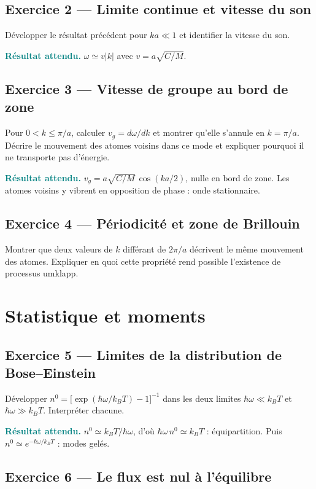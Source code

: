 \documentclass[11pt,a4paper]{article}
\newcommand{\rep}[1]{\par\smallskip\noindent\textcolor{teal}{\textbf{Résultat attendu.}}\; #1\par\smallskip}
\begin{document}
\subsection*{Exercice 2 --- Limite continue et vitesse du son}

Développer le résultat précédent pour $ka \ll 1$ et identifier la vitesse du son.

\rep{$\omega \simeq v|k|$ avec $v = a\sqrt{C/M}$.}

\subsection*{Exercice 3 --- Vitesse de groupe au bord de zone}

Pour $0<k\le\pi/a$, calculer $v_g = d\omega/dk$ et montrer qu'elle s'annule en $k = \pi/a$. Décrire le mouvement des
atomes voisins dans ce mode et expliquer pourquoi il ne transporte pas d'énergie.

\rep{$v_g = a\sqrt{C/M}\,\cos(ka/2)$, nulle en bord de zone. Les atomes voisins y vibrent en
opposition de phase : onde stationnaire.}

\subsection*{Exercice 4 --- Périodicité et zone de Brillouin}

Montrer que deux valeurs de $k$ différant de $2\pi/a$ décrivent le même mouvement des atomes.
Expliquer en quoi cette propriété rend possible l'existence de processus umklapp.

\section{Statistique et moments}

\subsection*{Exercice 5 --- Limites de la distribution de Bose--Einstein}

Développer $n^0 = \bigl[\exp(\hbar\omega/k_BT) - 1\bigr]^{-1}$ dans les deux limites
$\hbar\omega \ll k_BT$ et $\hbar\omega \gg k_BT$. Interpréter chacune.

\rep{$n^0 \simeq k_BT/\hbar\omega$, d'où $\hbar\omega\,n^0 \simeq k_BT$ : équipartition. Puis
$n^0 \simeq e^{-\hbar\omega/k_BT}$ : modes gelés.}

\subsection*{Exercice 6 --- Le flux est nul à l'équilibre}
\end{document}
